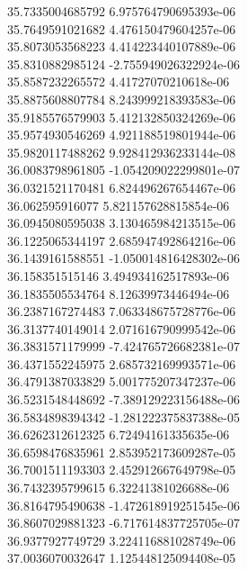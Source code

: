 {35.7335004685792 6.975764790695393e-06 \\
35.7649591021682 4.476150479604257e-06 \\
35.8073053568223 4.414223440107889e-06 \\
35.8310882985124 -2.755949026322924e-06 \\
35.8587232265572 4.41727070210618e-06 \\
35.8875608807784 8.243999218393583e-06 \\
35.9185576579903 5.412132850324269e-06 \\
35.9574930546269 4.921188519801944e-06 \\
35.9820117488262 9.928412936233144e-08 \\
36.0083798961805 -1.054209022299801e-07 \\
36.0321521170481 6.824496267654467e-06 \\
36.062595916077 5.821157628815854e-06 \\
36.0945080595038 3.130465984213515e-06 \\
36.1225065344197 2.685947492864216e-06 \\
36.1439161588551 -1.050014816428302e-06 \\
36.158351515146 3.494934162517893e-06 \\
36.1835505534764 8.12639973446494e-06 \\
36.2387167274483 7.063348675728776e-06 \\
36.3137740149014 2.071616790999542e-06 \\
36.3831571179999 -7.424765726682381e-07 \\
36.4371552245975 2.685732169993571e-06 \\
36.4791387033829 5.001775207347237e-06 \\
36.5231548448692 -7.389129223156488e-06 \\
36.5834898394342 -1.281222375837388e-05 \\
36.6262312612325 6.72494161335635e-06 \\
36.6598476835961 2.853952173609287e-05 \\
36.7001511193303 2.452912667649798e-05 \\
36.7432395799615 6.32241381026688e-06 \\
36.8164795490638 -1.472618919251545e-06 \\
36.8607029881323 -6.717614837725705e-07 \\
36.9377927749729 3.224116881028749e-06 \\
37.0036070032647 1.125448125094408e-05 \\
}
